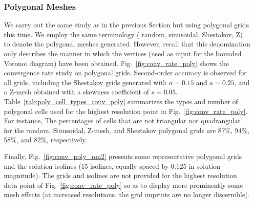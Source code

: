 \documentclass[preprint,10pt]{elsarticle}
\newcommand{\fig}[1]{Fig.~\ref{#1}}                      %
\newcommand{\tbl}[1]{Table~\ref{#1}}                     %
\begin{document}
\pagebreak
\newpage
\pagebreak
\newpage


\subsubsection{Polygonal Meshes} \label{sec:results_conv_poly}

We carry out the same study as in the previous Section but using polygonal grids this time. We employ the same terminology (
random, sinusoidal, Shestakov, Z) to denote the polygonal meshes generated. However, recall that this denomination
only describes the manner in which the vertices (used as input for the bounded Voronoi diagram) have been obtained.
%
\fig{fig:conv_rate_poly} shows the convergence rate study on polygonal grids. Second-order accuracy is observed for all 
grids, including the Shestakov grids generated with $a=0.15$ and $a=0.25$, and a Z-mesh obtained with a skewness 
coefficient of $s=0.05$.
\tbl{tab:poly_cell_types_conv_poly} summarizes the types and number of polygonal cells used for the highest resolution point in 
\fig{fig:conv_rate_poly}. For instance, The percentages of cells that are not triangular nor quadrangular for the random, Sinusoidal, 
Z-mesh, and Shestakov polygonal grids are 87\%, 94\%, 58\%, and 82\%, respectively.

Finally, \fig{fig:conv_poly_nm2} presents some representative polygonal grids and the solution isolines (15 isolines, equally spaced by 0.125 in solution magnitude). The grids and isolines are not provided for the highest resolution data point of \fig{fig:conv_rate_poly} so as to display more prominently some mesh effects (at increased resolutions, the grid imprints are no longer discernible).
\end{document}
